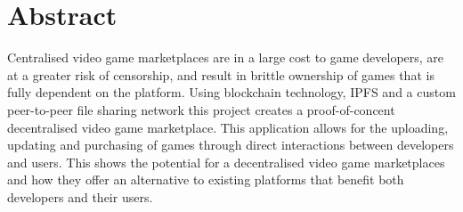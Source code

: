 \section*{Abstract}

Centralised video game marketplaces are in a large cost to game developers, are at a greater risk of censorship, and result in brittle ownership of games that is fully dependent on the platform. 
\x
Using blockchain technology, IPFS and a custom peer-to-peer file sharing network this project creates a proof-of-concent decentralised video game marketplace. This application allows for the uploading, updating and purchasing of games through direct interactions between developers and users. 
\x
This shows the potential for a decentralised video game marketplaces and how they offer an alternative to existing platforms that benefit both developers and their users.